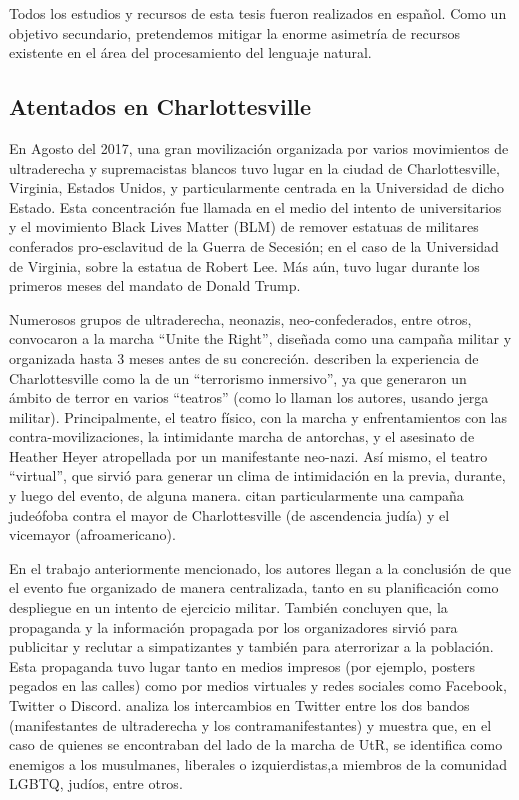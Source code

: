 Todos los estudios y recursos de esta tesis fueron realizados en español. Como un objetivo secundario, pretendemos mitigar la enorme asimetría de recursos existente en el área del procesamiento del lenguaje natural.



\subsection{Atentados en Charlottesville}

En Agosto del 2017, una gran movilización organizada por varios movimientos de ultraderecha y supremacistas blancos tuvo lugar en la ciudad de Charlottesville, Virginia, Estados Unidos, y particularmente centrada en la Universidad de dicho Estado. Esta concentración fue llamada en el medio del intento de universitarios y el movimiento Black Lives Matter (BLM) de remover estatuas de militares conferados pro-esclavitud de la Guerra de Secesión; en el caso de la Universidad de Virginia, sobre la estatua de Robert Lee. Más aún, tuvo lugar durante los primeros meses del mandato de Donald Trump.

Numerosos grupos de ultraderecha, neonazis, neo-confederados, entre otros, convocaron a la marcha ``Unite the Right'', diseñada como una campaña militar y organizada hasta 3 meses antes de su concreción. \citet{blout2020white} describen la experiencia de Charlottesville como la de un ``terrorismo inmersivo'', ya que generaron un ámbito de terror en varios ``teatros'' (como lo llaman los autores, usando jerga militar). Principalmente, el teatro físico, con la marcha y enfrentamientos con las contra-movilizaciones, la intimidante marcha de antorchas, y el asesinato de Heather Heyer atropellada por un manifestante neo-nazi. Así mismo, el teatro ``virtual'', que sirvió para generar un clima de intimidación en la previa, durante, y luego del evento, de alguna manera. \citet{blout2020white} citan particularmente una campaña judeófoba contra el mayor de Charlottesville (de ascendencia judía) y el vicemayor (afroamericano).

En el trabajo anteriormente mencionado, los autores llegan a la conclusión de que el evento fue organizado de manera centralizada, tanto en su planificación como despliegue en un intento de ejercicio militar. También concluyen que, la propaganda y la información propagada por los organizadores sirvió para publicitar y reclutar a simpatizantes y también para aterrorizar a la población. Esta propaganda tuvo lugar tanto en medios impresos (por ejemplo, posters pegados en las calles) como por medios virtuales y redes sociales como Facebook, Twitter o Discord. \citet{klein2019twitter} analiza los intercambios en Twitter entre los dos bandos (manifestantes de ultraderecha y los contramanifestantes) y muestra que, en el caso de quienes se encontraban del lado de la marcha de UtR, se identifica como enemigos a los musulmanes, liberales o izquierdistas,a miembros de la comunidad LGBTQ, judíos, entre otros.


